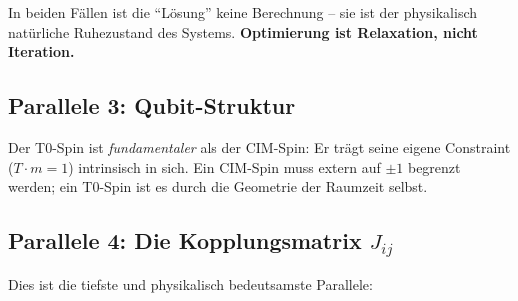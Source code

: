 In beiden Fällen ist die ``Lösung'' keine Berechnung -- sie ist der physikalisch 
natürliche Ruhezustand des Systems. \textbf{Optimierung ist Relaxation, nicht Iteration.}

\subsection{Parallele 3: Qubit-Struktur}

\begin{table}[h]
    \centering
    \caption{Parallele 3: Vergleich der Qubit-Strukturen}
    \label{tab:parallel3}
\end{table}

\begin{important}[Fundamentalunterschied]
    Der T0-Spin ist \emph{fundamentaler} als der CIM-Spin: Er trägt seine eigene 
    Constraint ($T \cdot m = 1$) intrinsisch in sich. Ein CIM-Spin muss extern auf 
    $\pm 1$ begrenzt werden; ein T0-Spin ist es durch die Geometrie der Raumzeit selbst.
\end{important}

\subsection{Parallele 4: Die Kopplungsmatrix $J_{ij}$}
\label{subsec:coupling}

Dies ist die tiefste und physikalisch bedeutsamste Parallele:

